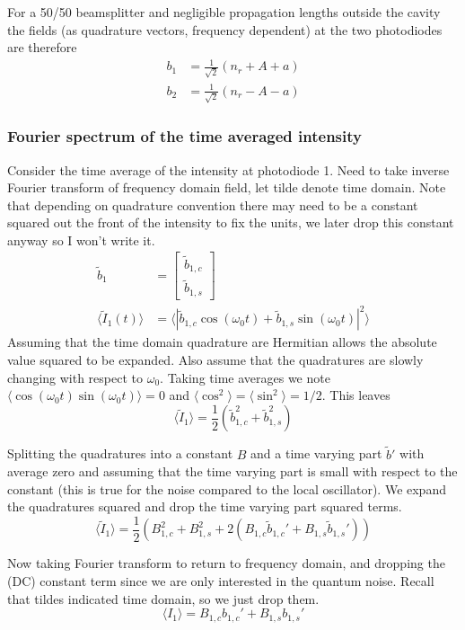 \documentclass[aps,pra,superscriptaddress,reprint,nofootinbib]{revtex4-1}
\newcommand{\abs}[1]{\left\lvert #1 \right\rvert}
\newcommand{\expect}[1]{\langle #1 \rangle}
\begin{document}
For a 50/50 beamsplitter and negligible propagation lengths outside the cavity the fields (as quadrature vectors, frequency dependent) at the two photodiodes are therefore
\begin{align*}
b_1 &= \frac{1}{\sqrt{2}} \left( n_r + A + a\right) \\
b_2 &= \frac{1}{\sqrt{2}} \left( n_r - A - a\right)
\end{align*}

\subsubsection{Fourier spectrum of the time averaged intensity}

Consider the time average of the intensity at photodiode 1. Need to take inverse Fourier transform of frequency domain field, let tilde denote time domain. Note that depending on quadrature convention there may need to be a constant squared out the front of the intensity to fix the units, we later drop this constant anyway so I won’t write it. 
\begin{align*}
\tilde{b}_1 &= \begin{bmatrix}
\tilde{b}_{1,c}\\ 
\tilde{b}_{1,s}
\end{bmatrix} \\
\expect{\tilde{I}_1(t)} &= \expect{\abs{\tilde{b}_{1,c} \cos(\omega_0 t) + \tilde{b}_{1,s} \sin(\omega_0 t)}^2}
\end{align*}
Assuming that the time domain quadrature are Hermitian allows the absolute value squared to be expanded. Also assume that the quadratures are slowly changing with respect to $\omega_0$. Taking time averages we note $\expect{\cos(\omega_0 t) \sin(\omega_0 t)} = 0$ and $\expect{\cos^2} = \expect{\sin^2} = 1/2$. This leaves
$$\expect{\tilde{I}_1} = \frac{1}{2} \left( \tilde{b}_{1,c}^2 + \tilde{b}_{1,s}^2 \right)$$


Splitting the quadratures into a constant $B$ and a time varying part $\tilde{b}'$ with average zero and assuming that the time varying part is small with respect to the constant (this is true for the noise compared to the local oscillator). We expand the quadratures squared and drop the time varying part squared terms.
$$\expect{\tilde{I}_1} = \frac{1}{2} \left( B_{1,c}^2 + B_{1,s}^2 + 2 \left( B_{1,c} \tilde{b}_{1,c}' + B_{1,s} \tilde{b}_{1,s}' \right) \right)$$


Now taking Fourier transform to return to frequency domain, and dropping the (DC) constant term since we are only interested in the quantum noise. Recall that tildes indicated time domain, so we just drop them.
$$\expect{I_1} = B_{1,c} b_{1,c}' + B_{1,s} b_{1,s}'$$
\end{document}
